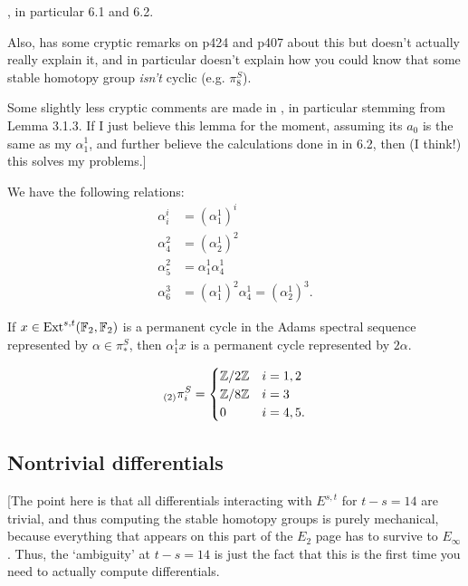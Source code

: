 \documentclass{MetricNotes2023}
\def\bb{\ensuremath\mathbb}
\def\inte{\ensuremath\mathbb{Z}}
\DeclareMathOperator{\Ext}{Ext}
\begin{document}
\autocite{ass}, in particular 6.1 and 6.2.

Also, \autocite{spectral_sequences} has some cryptic remarks on p424 and p407 about this but doesn't actually really explain it, and in particular doesn't explain how you could know that some stable homotopy group \textit{isn't} cyclic (e.g. \(\pi_8^S\)).

Some slightly less cryptic comments are made in \autocite{cobordism}, in particular stemming from Lemma 3.1.3. If I just believe this lemma for the moment, assuming its \(a_0\) is the same as my \(\alpha^1_1\), and further believe the calculations done in \autocite{ass} in 6.2, then (I think!) this solves my problems.]

\begin{proposition}
We have the following relations:
\begin{align*}
\alpha^i_i &= (\alpha_1^1)^i\\
\alpha_4^2&=(\alpha^1_2)^2\\
\alpha^2_5&=\alpha^1_1 \alpha^1_4\\
\alpha^3_6&=(\alpha^1_1)^2 \alpha_4^1=(\alpha^1_2)^3.
\end{align*}
\end{proposition}

\begin{proposition}
If \(x \in \Ext^{s,t}(\bb{F}_2, \bb{F}_2)\) is a permanent cycle in the Adams spectral sequence represented by \(\alpha \in \pi_*^S\), then \(\alpha^1_1x\) is a permanent cycle represented by \(2 \alpha\). 
\end{proposition}

\begin{theorem}
\begin{align*}
\text{}_{(2)}\pi_i^S = \begin{cases}
\inte/2\inte & i = 1, 2\\
\inte/8\inte & i = 3\\
0 & i = 4, 5.
\end{cases}
\end{align*}
\end{theorem}

\subsection{Nontrivial differentials}

[The point here is that all differentials interacting with \(E^{s,t}\) for \(t-s=14\) are trivial, and thus computing the stable homotopy groups is purely mechanical, because everything that appears on this part of the \(E_2\) page has to survive to \(E_\infty\). Thus, the `ambiguity' at \(t-s=14\) is just the fact that this is the first time you need to actually compute differentials.
\end{document}
